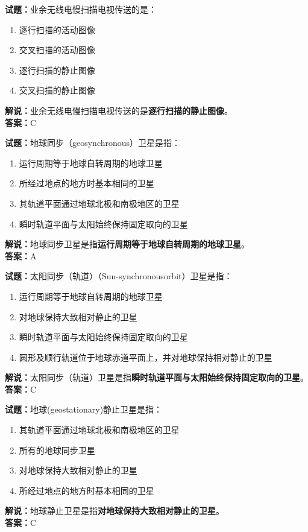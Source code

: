 \documentclass{ctexbook}
\begin{document}
\vspace{1em}

\textbf{试题：}业余无线电慢扫描电视传送的是：
\begin{enumerate}[leftmargin=3em]
  \item 逐行扫描的活动图像
  \item 交叉扫描的活动图像
  \item 逐行扫描的静止图像
  \item 交叉扫描的静止图像
\end{enumerate}
\noindent\textbf{解说：}业余无线电慢扫描电视传送的是\textbf{逐行扫描的静止图像}。\\\noindent\textbf{答案：}C

\vspace{1em}

\textbf{试题：}地球同步（geosynchronous）卫星是指：
\begin{enumerate}[leftmargin=3em]
  \item 运行周期等于地球自转周期的地球卫星
  \item 所经过地点的地方时基本相同的卫星
  \item 其轨道平面通过地球北极和南极地区的卫星
  \item 瞬时轨道平面与太阳始终保持固定取向的卫星
\end{enumerate}
\noindent\textbf{解说：}地球同步卫星是指\textbf{运行周期等于地球自转周期的地球卫星}。\\\noindent\textbf{答案：}A

\vspace{1em}

\textbf{试题：}太阳同步（轨道）（Sun-synchronousorbit）卫星是指：
\begin{enumerate}[leftmargin=3em]
  \item 运行周期等于地球自转周期的地球卫星
  \item 对地球保持大致相对静止的卫星
  \item 瞬时轨道平面与太阳始终保持固定取向的卫星
  \item 圆形及顺行轨道位于地球赤道平面上，并对地球保持相对静止的卫星
\end{enumerate}
\noindent\textbf{解说：}太阳同步（轨道）卫星是指\textbf{瞬时轨道平面与太阳始终保持固定取向的卫星}。\\\noindent\textbf{答案：}C

\vspace{1em}

\textbf{试题：}地球(geostationary)静止卫星是指：
\begin{enumerate}[leftmargin=3em]
  \item 其轨道平面通过地球北极和南极地区的卫星
  \item 所有的地球同步卫星
  \item 对地球保持大致相对静止的卫星
  \item 所经过地点的地方时基本相同的卫星
\end{enumerate}
\noindent\textbf{解说：}地球静止卫星是指\textbf{对地球保持大致相对静止的卫星}。\\\noindent\textbf{答案：}C
\end{document}
